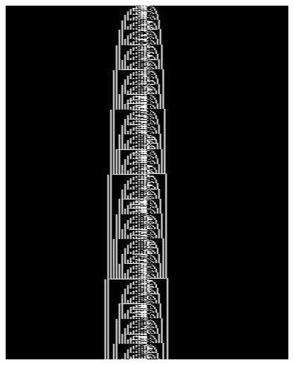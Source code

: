 \begin{figure}[h!]
\begin{minipage}{\textwidth}
{\begin{minipage}{0.3\textwidth}
                \includegraphics[width=\linewidth]{figures/sporadic-machines/sk10.png}


\end{minipage}}
\end{minipage}
\end{figure}
